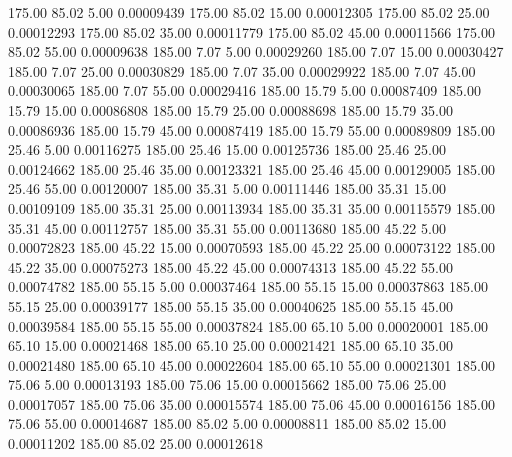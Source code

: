     175.00     85.02      5.00     0.00009439
    175.00     85.02     15.00     0.00012305
    175.00     85.02     25.00     0.00012293
    175.00     85.02     35.00     0.00011779
    175.00     85.02     45.00     0.00011566
    175.00     85.02     55.00     0.00009638
    185.00      7.07      5.00     0.00029260
    185.00      7.07     15.00     0.00030427
    185.00      7.07     25.00     0.00030829
    185.00      7.07     35.00     0.00029922
    185.00      7.07     45.00     0.00030065
    185.00      7.07     55.00     0.00029416
    185.00     15.79      5.00     0.00087409
    185.00     15.79     15.00     0.00086808
    185.00     15.79     25.00     0.00088698
    185.00     15.79     35.00     0.00086936
    185.00     15.79     45.00     0.00087419
    185.00     15.79     55.00     0.00089809
    185.00     25.46      5.00     0.00116275
    185.00     25.46     15.00     0.00125736
    185.00     25.46     25.00     0.00124662
    185.00     25.46     35.00     0.00123321
    185.00     25.46     45.00     0.00129005
    185.00     25.46     55.00     0.00120007
    185.00     35.31      5.00     0.00111446
    185.00     35.31     15.00     0.00109109
    185.00     35.31     25.00     0.00113934
    185.00     35.31     35.00     0.00115579
    185.00     35.31     45.00     0.00112757
    185.00     35.31     55.00     0.00113680
    185.00     45.22      5.00     0.00072823
    185.00     45.22     15.00     0.00070593
    185.00     45.22     25.00     0.00073122
    185.00     45.22     35.00     0.00075273
    185.00     45.22     45.00     0.00074313
    185.00     45.22     55.00     0.00074782
    185.00     55.15      5.00     0.00037464
    185.00     55.15     15.00     0.00037863
    185.00     55.15     25.00     0.00039177
    185.00     55.15     35.00     0.00040625
    185.00     55.15     45.00     0.00039584
    185.00     55.15     55.00     0.00037824
    185.00     65.10      5.00     0.00020001
    185.00     65.10     15.00     0.00021468
    185.00     65.10     25.00     0.00021421
    185.00     65.10     35.00     0.00021480
    185.00     65.10     45.00     0.00022604
    185.00     65.10     55.00     0.00021301
    185.00     75.06      5.00     0.00013193
    185.00     75.06     15.00     0.00015662
    185.00     75.06     25.00     0.00017057
    185.00     75.06     35.00     0.00015574
    185.00     75.06     45.00     0.00016156
    185.00     75.06     55.00     0.00014687
    185.00     85.02      5.00     0.00008811
    185.00     85.02     15.00     0.00011202
    185.00     85.02     25.00     0.00012618
